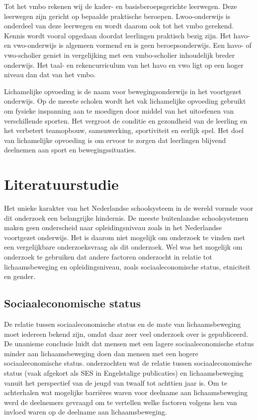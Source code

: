 \documentclass[a4paper,12pt]{memoir}
\begin{document}
Tot het vmbo rekenen wij de kader- en basisberoepsgerichte leerwegen. Deze leerwegen zijn gericht op bepaalde praktische beroepen. Lwoo-onderwijs is onderdeel van deze leerwegen en wordt daarom ook tot het vmbo gerekend. Kennis wordt vooral opgedaan doordat leerlingen praktisch bezig zijn. Het havo- en vwo-onderwijs is algemeen vormend en is geen beroepsonderwijs. Een havo- of vwo-scholier geniet in vergelijking met een vmbo-scholier inhoudelijk breder onderwijs. Het taal- en rekencurriculum van het havo en vwo ligt op een hoger niveau dan dat van het vmbo.

Lichamelijke opvoeding is de naam voor bewegingsonderwijs in het voortgezet onderwijs. Op de meeste scholen wordt het vak lichamelijke opvoeding gebruikt om fysieke inspanning aan te moedigen door middel van het uitoefenen van verschillende sporten. Het vergroot de conditie en gezondheid van de leerling en het verbetert teamopbouw, samenwerking, sportiviteit en eerlijk spel. Het doel van lichamelijke opvoeding is om ervoor te zorgen dat leerlingen blijvend deelnemen aan sport en bewegingssituaties.

\chapter{Literatuurstudie}

Het unieke karakter van het Nederlandse schoolsysteem in de wereld vormde voor dit onderzoek een belangrijke hindernis. De meeste buitenlandse schoolsystemen maken geen onderscheid naar opleidingsniveau zoals in het Nederlandse voortgezet onderwijs. Het is daarom niet mogelijk om onderzoek te vinden met een vergelijkbare onderzoeksvraag als dit onderzoek. Wel was het mogelijk om onderzoek te gebruiken dat andere factoren onderzocht in relatie tot lichaamsbeweging en opleidingsniveau, zoals sociaaleconomische status, etniciteit en gender.

\section{Sociaaleconomische status}

De relatie tussen sociaaleconomische status en de mate van lichaamsbeweging moet iedereen bekend zijn, omdat daar zeer veel onderzoek over is gepubliceerd. De unanieme conclusie luidt dat mensen met een lagere sociaaleconomische status minder aan lichaamsbeweging doen dan mensen met een hogere sociaaleconomische status. \textcite{humbert} onderzochten wat de relatie tussen sociaaleconomische status (vaak afgekort als SES in Engelstalige publicaties) en lichaamsbeweging vanuit het perspectief van de jeugd van twaalf tot achttien jaar is. Om te achterhalen wat mogelijke barrières waren voor deelname aan lichaamsbeweging werd de deelnemers gevraagd om te vertellen welke factoren volgens hen van invloed waren op de deelname aan lichaamsbeweging.
\end{document}
